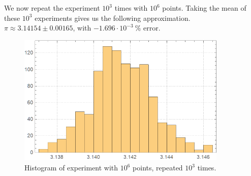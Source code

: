 \documentclass[12pt]{article}
\numberwithin{equation}{section}
\begin{document}
We now repeat the experiment $10^3$ times with $10^6$ points. Taking the mean of these $10^3$ experiments gives us the following approximation. $\pi \approx 3.14154 \pm 0.00165$, with $ -1.696 \cdot 10^{-3}\ \%$ error.
\begin{figure}[!htb]
    \centering
    \includegraphics[width=10cm]{Images/repeatedpi.png}
    \caption{Histogram of experiment with $10^6$ points, repeated $10^3$ times.}
    \label{fig:repeatedpi}
\end{figure}
\end{document}
